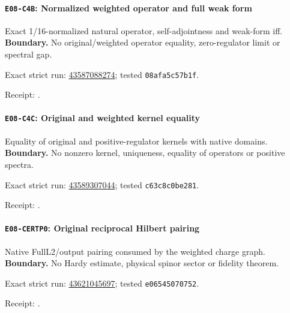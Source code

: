 \paragraph{\texttt{E08-C4B}: Normalized weighted operator and full weak form}
Exact 1/16-normalized natural operator, self-adjointness and weak-form iff.
\textbf{Boundary.} No original/weighted operator equality, zero-regulator limit or spectral gap.
\par\noindent Exact strict run: \href{https://github.com/etblink/math/actions/runs/43587088274}{43587088274}; tested \texttt{08afa5c57b1f}.\par
\begingroup\small\sloppy\noindent Receipt: .\par\endgroup
\paragraph{\texttt{E08-C4C}: Original and weighted kernel equality}
Equality of original and positive-regulator kernels with native domains.
\textbf{Boundary.} No nonzero kernel, uniqueness, equality of operators or positive spectra.
\par\noindent Exact strict run: \href{https://github.com/etblink/math/actions/runs/43589307044}{43589307044}; tested \texttt{c63c8c0be281}.\par
\begingroup\small\sloppy\noindent Receipt: .\par\endgroup
\paragraph{\texttt{E08-CERTP0}: Original reciprocal Hilbert pairing}
Native FullL2/output pairing consumed by the weighted charge graph.
\textbf{Boundary.} No Hardy estimate, physical spinor sector or fidelity theorem.
\par\noindent Exact strict run: \href{https://github.com/etblink/math/actions/runs/43621045697}{43621045697}; tested \texttt{e06545070752}.\par
\begingroup\small\sloppy\noindent Receipt: .\par\endgroup
